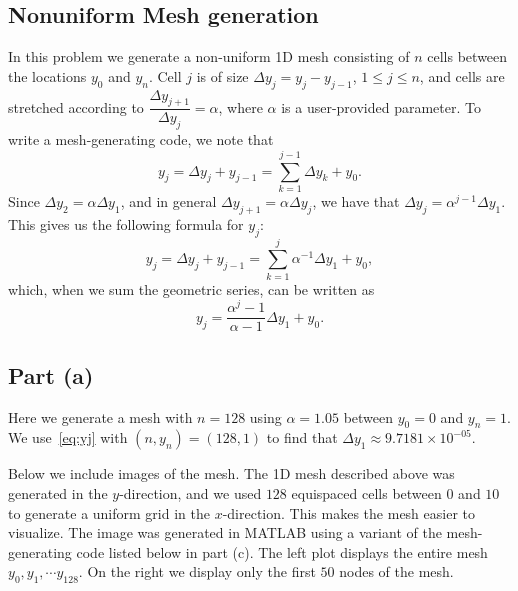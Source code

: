 \documentclass{article}
\begin{document}
\begin{itemize}
\section{ Nonuniform Mesh generation}

In this problem we generate a non-uniform 1D mesh consisting of $n$ cells between the locations $y_0$ and $y_n$. Cell $j$ is of size $\Delta y_j = y_j-y_{j-1}$, $ 1\leq j \leq n$, and cells are stretched according to $\dfrac{\Delta y_{j+1}}{\Delta y_j}  =\alpha$, where $\alpha$ is a user-provided parameter. To write a mesh-generating code, we note that 
\[ y_j  = \Delta y_j + y_{j-1} = \sum_{k=1}^{j-1} \Delta y_k + y_0.\]
Since $\Delta y_2 = \alpha \Delta y_1$, and in general $\Delta y_{j+1} = \alpha  \Delta y_{j}$, we have that $\Delta y_{j} = \alpha^{j-1} \Delta y_1$. This gives us the following formula for $y_j$:
\[ y_j  = \Delta y_j + y_{j-1} = \sum_{k=1}^{j} \alpha^{-1} \Delta y_1 + y_0, \]
which, when we sum the geometric series, can be written as 
\begin{equation}
\label{eq:yj}
 y_j = \dfrac{\alpha^{j}-1}{\alpha -1} \Delta y_1 +y_0. 
\end{equation}

\subsection{Part (a)}
Here we generate a mesh with $n=128$ using $ \alpha = 1.05$ between $y_0 = 0$ and $y_n = 1$.  We use~\eqref{eq:yj} with $(n, y_n) = (128, 1)$ to find that $ \Delta y_1 \approx 9.7181 \times 10^{-05} $.  

Below we include images of the mesh. The 1D mesh described above was generated in the $y$-direction, and we used $128$ equispaced cells between $0$ and $10$ to generate a uniform grid in the $x$-direction. This makes the mesh easier to visualize. The image was generated in MATLAB using a variant of the mesh-generating code listed below in part (c).
The left plot displays the entire mesh $y_0, y_1, \cdots y_{128}$. On the right we display only the first $50$ nodes of the mesh. 

\vspace{1cm}


\end{itemize}
\end{document}
